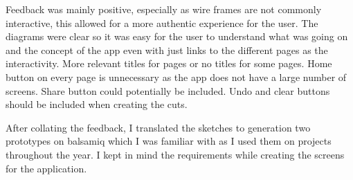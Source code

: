 \documentclass[11pt]{article}
\begin{document}
    Feedback was mainly positive, especially as wire frames are not commonly interactive, this allowed for a more authentic experience for the user. The diagrams were clear so it was easy for the user to understand what was going on and the concept of the app even with just links to the different pages as the interactivity.
    More relevant titles for pages or no titles for some pages. Home button on every page is unnecessary as the app does not have a large number of screens. Share button could potentially be included. Undo and clear buttons should be included when creating the cuts. 
    
    
    After collating the feedback, I translated the sketches to generation two prototypes on balsamiq which I was familiar with as I used them on projects throughout the year. %
    I kept in mind the requirements while creating the screens for the application.
    
\end{document}
